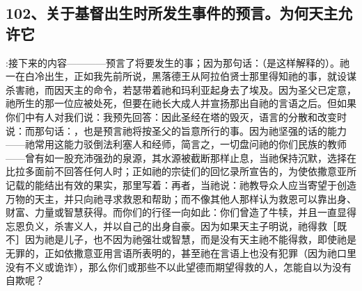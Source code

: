 
\subsection{102、关于基督出生时所发生事件的预言。为何天主允许它}

:接下来的内容————预言了将要发生的事；因为那句话：（是这样解释的）。祂一在白冷出生，正如我先前所说，黑落德王从阿拉伯贤士那里得知祂的事，就设谋杀害祂，而因天主的命令，若瑟带着祂和玛利亚起身去了埃及。因为圣父已定意，祂所生的那一位应被处死，但要在祂长大成人并宣扬那出自祂的言语之后。但如果你们中有人对我们说：我预先回答：因此圣经在塔的毁灭，语言的分散和改变时说：而那句话：，也是预言祂将按圣父的旨意所行的事。因为祂坚强的话的能力——祂常用这能力驳倒法利塞人和经师，简言之，一切盘问祂的你们民族的教师——曾有如一股充沛强劲的泉源，其水源被截断那样止息，当祂保持沉默，选择在比拉多面前不回答任何人时；正如祂的宗徒们的回忆录所宣告的，为使依撒意亚所记载的能结出有效的果实，那里写着：再者，当祂说：祂教导众人应当寄望于创造万物的天主，并只向祂寻求救恩和帮助；而不像其他人那样认为救恩可以靠出身、财富、力量或智慧获得。而你们的行径一向如此：你们曾造了牛犊，并且一直显得忘恩负义，杀害义人，并以自己的出身自豪。因为如果天主子明说，祂得救［既不］因为祂是儿子，也不因为祂强壮或智慧，而是没有天主祂不能得救，即使祂是无罪的，正如依撒意亚用言语所表明的，甚至祂在言语上也没有犯罪（因为祂口里没有不义或诡诈），那么你们或那些不以此望德而期望得救的人，怎能自以为没有自欺呢？\par

